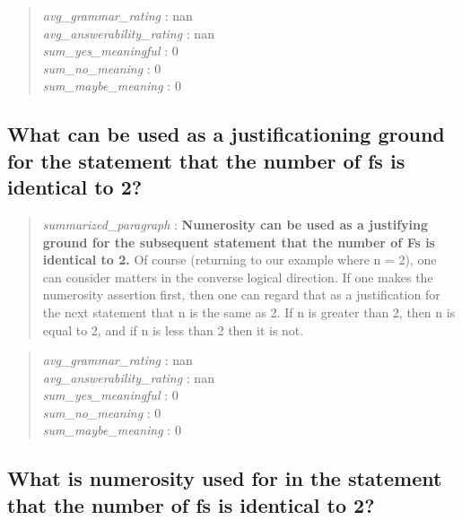 \begin{quote}
\emph{avg\_grammar\_rating} : nan\\
\emph{avg\_answerability\_rating} : nan\\
\emph{sum\_yes\_meaningful} : 0\\
\emph{sum\_no\_meaning} : 0\\
\emph{sum\_maybe\_meaning} : 0
\end{quote}

\hypertarget{what-can-be-used-as-a-justificationing-ground-for-the-statement-that-the-number-of-fs-is-identical-to-2}{%
\subsection{What can be used as a justificationing ground for the
statement that the number of fs is identical to
2?}\label{what-can-be-used-as-a-justificationing-ground-for-the-statement-that-the-number-of-fs-is-identical-to-2}}

\begin{quote}
\emph{summarized\_paragraph} : \textbf{Numerosity can be used as a
justifying ground for the subsequent statement that the number of Fs is
identical to 2.} Of course (returning to our example where n = 2), one
can consider matters in the converse logical direction. If one makes the
numerosity assertion first, then one can regard that as a justification
for the next statement that n is the same as 2. If n is greater than 2,
then n is equal to 2, and if n is less than 2 then it is not.
\end{quote}

\begin{quote}
\emph{avg\_grammar\_rating} : nan\\
\emph{avg\_answerability\_rating} : nan\\
\emph{sum\_yes\_meaningful} : 0\\
\emph{sum\_no\_meaning} : 0\\
\emph{sum\_maybe\_meaning} : 0
\end{quote}

\hypertarget{what-is-numerosity-used-for-in-the-statement-that-the-number-of-fs-is-identical-to-2}{%
\subsection{What is numerosity used for in the statement that the number
of fs is identical to
2?}\label{what-is-numerosity-used-for-in-the-statement-that-the-number-of-fs-is-identical-to-2}}

